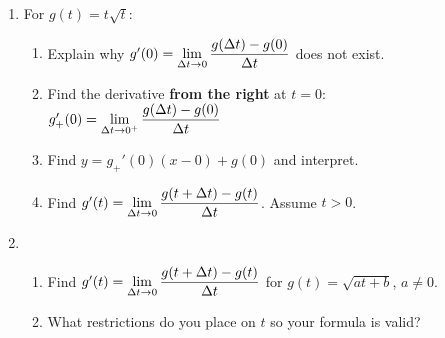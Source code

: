 \begin{enumerate}
\setcounter{enumi}{\value{HW}}

\item  For  $g(t) = t \sqrt{t}$:

\begin{enumerate}

\item  Explain why $g'(0) = \displaystyle{\lim_{\Delta t \rightarrow 0} \dfrac{g(\Delta t) - g(0)}{\Delta t}}$ does not exist.

\item Find the  derivative \textbf{from the right} at $t=0$:  $g_{+}'(0) = \displaystyle{\lim_{\Delta t \rightarrow 0^{+}} \dfrac{g(\Delta t) - g(0)}{\Delta t}}$

\item  Find $y = g_{+}'(0) (x-0) + g(0)$ and interpret.

\item Find  $g'(t) =  \displaystyle{\lim_{\Delta t \rightarrow 0} \dfrac{g(t+\Delta t) - g(t)}{\Delta t}}$.  Assume $t>0$.

\end{enumerate}


\item  \begin{enumerate} \item Find  $g'(t) =  \displaystyle{\lim_{\Delta t \rightarrow 0} \dfrac{g(t+\Delta t) - g(t)}{\Delta t}}$ for  $g(t) = \sqrt{at+b}$, $a \neq 0$. 

\smallskip

\item What restrictions do you place on $t$ so your formula is valid?

\end{enumerate}


\setcounter{HW}{\value{enumi}}
\end{enumerate}


